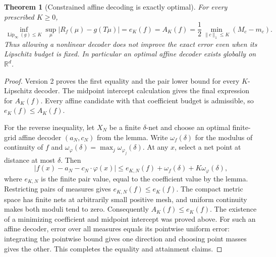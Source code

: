 \documentclass[11pt]{article}
\newtheorem{theorem}{Theorem}
\theoremstyle{definition}
\begin{document}
\begin{theorem}[Constrained affine decoding is exactly optimal]
For every prescribed $K\geq0$,
\[
 \inf_{\operatorname{Lip}_\infty(g)\leq K}
    \sup_\mu|R_f(\mu)-g(T\mu)|
 =e_K(f)=A_K(f)
 =\frac12\min_{\|c\|_1\leq K}(M_c-m_c).
\]
Thus allowing a nonlinear decoder does not improve the exact error even
when its Lipschitz budget is fixed. In particular an optimal affine decoder
exists globally on $\mathbb R^d$.
\end{theorem}
\begin{proof}
Version 2 proves the first equality and the pair lower bound for every
$K$-Lipschitz decoder. The midpoint intercept calculation gives the final
expression for $A_K(f)$. Every affine candidate with that coefficient
budget is admissible, so $e_K(f)\leq A_K(f)$.

For the reverse inequality, let $X_N$ be a finite $\delta$-net and choose
an optimal finite-grid affine decoder $(a_N,c_N)$ from the lemma. Write
$\omega_f(\delta)$ for the modulus of continuity of $f$ and
$\omega_\varphi(\delta)=\max_j\omega_{\varphi_j}(\delta)$.
At any $x$, select a net point at distance at most $\delta$. Then
\[
 |f(x)-a_N-c_N\cdot\varphi(x)|
 \leq e_{K,N}(f)+\omega_f(\delta)
                      +K\omega_\varphi(\delta),
\]
where $e_{K,N}$ is the finite pair value, equal to the coefficient value
by the lemma. Restricting pairs of measures gives $e_{K,N}(f)\leq e_K(f)$.
The compact metric space has finite nets at arbitrarily small positive
mesh, and uniform continuity makes both moduli tend to zero. Consequently
$A_K(f)\leq e_K(f)$. The existence of a minimizing coefficient and
midpoint intercept was proved above. For such an affine decoder, error
over all measures equals its pointwise uniform error: integrating the
pointwise bound gives one direction and choosing point masses gives the
other. This completes the equality and attainment claims.
\end{proof}
\end{document}
